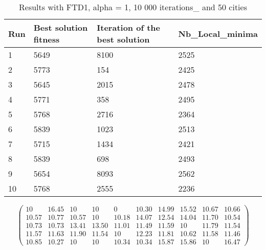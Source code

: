 \documentclass[12pt,oneside,a4paper]{article}
\begin{document}
\begin{table}[h]
  \centering
  \small
  \begin{tabular}{llll}
    \hline
    \multicolumn{1}{|l|}{\textbf{Run}}& \multicolumn{1}{l|}{\textbf{Best solution fitness}}& \multicolumn{1}{l|}{\textbf{Iteration of the best solution}}& \multicolumn{1}{l|}{\textbf{Nb\_Local\_minima}}\\ \hline
    \multicolumn{1}{|l|}{1} & \multicolumn{1}{l|}{5649}  & \multicolumn{1}{l|}{8100} & \multicolumn{1}{l|}{2525}  \\ \hline
    \multicolumn{1}{|l|}{2} & \multicolumn{1}{l|}{5773}  & \multicolumn{1}{l|}{154} & \multicolumn{1}{l|}{2425}  \\ \hline         
    \multicolumn{1}{|l|}{3} & \multicolumn{1}{l|}{5645}  & \multicolumn{1}{l|}{2015}  & \multicolumn{1}{l|}{2478}  \\ \hline
    \multicolumn{1}{|l|}{4} & \multicolumn{1}{l|}{5771}  & \multicolumn{1}{l|}{358}  & \multicolumn{1}{l|}{2495}  \\ \hline
    \multicolumn{1}{|l|}{5} & \multicolumn{1}{l|}{5768}  & \multicolumn{1}{l|}{2716}  & \multicolumn{1}{l|}{2364}  \\ \hline
    \multicolumn{1}{|l|}{6} & \multicolumn{1}{l|}{5839}  & \multicolumn{1}{l|}{1023}  & \multicolumn{1}{l|}{2513}  \\ \hline
    \multicolumn{1}{|l|}{7} & \multicolumn{1}{l|}{5715}  & \multicolumn{1}{l|}{1434}  & \multicolumn{1}{l|}{2421}  \\ \hline
    \multicolumn{1}{|l|}{8} & \multicolumn{1}{l|}{5839}  & \multicolumn{1}{l|}{698} & \multicolumn{1}{l|}{2493}  \\ \hline
    \multicolumn{1}{|l|}{9} & \multicolumn{1}{l|}{5654}  & \multicolumn{1}{l|}{8093} & \multicolumn{1}{l|}{2562}  \\ \hline
    \multicolumn{1}{|l|}{10} & \multicolumn{1}{l|}{5768}  & \multicolumn{1}{l|}{2555} & \multicolumn{1}{l|}{2236}  \\ \hline
  \end{tabular}
  \caption{Results with FTD1, alpha = 1, 10 000 iterations\_ and 50 cities}
\end{table}

\begin{equation}
  \tag{Mean Tabu Duration for each city (alpha = 1 and 50 cities)}
  \begin{pmatrix} 10 & 16.45 & 10 & 10 & 0 & 10.30 & 14.99 & 15.52 & 10.67 & 10.66 \\
                  10.57 & 10.77 & 10.57 & 10 & 10.18 & 14.07 & 12.54 & 14.04 & 11.70 & 10.54 \\
                  10.73 & 10.73 & 13.41 & 13.50 & 11.01 & 11.49 & 11.59 & 10 & 11.79 & 11.54 \\
                  11.57 & 11.63 & 11.90 & 11.54 & 10 & 12.23 & 11.81 & 10.62 & 11.58 & 11.46 \\
                  10.85 & 10.27 & 10 & 10 & 10.34 & 10.34 & 15.87 & 15.86 & 10 & 16.47 
  \end{pmatrix}
\end{equation}
\end{document}
